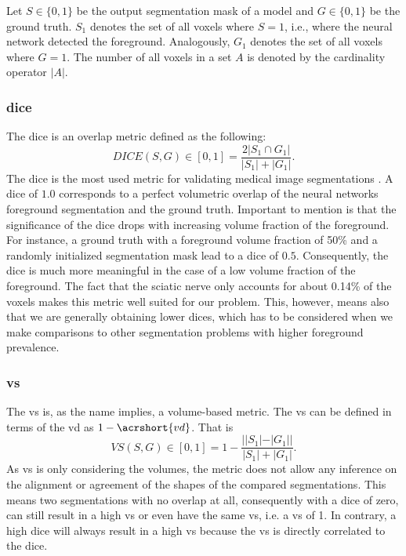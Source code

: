 Let $S \in \{0, 1\}$ be the output segmentation mask of a model and $G \in \{0, 1\}$ be the ground truth.
$S_{1}$ denotes the set of all voxels where $S = 1$, i.e., where the neural network detected the foreground. Analogously, $G_{1}$ denotes the set of all voxels where $G = 1$. The number of all voxels in a set $A$ is denoted by the cardinality operator $|A|$.

\subsubsection{\glsdesc{dice}}
The \gls{dice} \cite{Dice1945MeasuresTh} is an overlap metric defined as the following:
\begin{equation}
   DICE(S, G) \in [0, 1] = \frac{2|S_{1} \cap G_{1}|}{|S_{1}| + |G_{1}|}.
   \label{eq:dice}
\end{equation}
The \acrlong{dice} is the most used metric for validating medical image segmentations \cite{Taha2015MetricsTool}. A \acrlong{dice} of $1.0$ corresponds to a perfect volumetric overlap of the neural networks foreground segmentation and the ground truth. Important to mention is that the significance of the \acrlong{dice} drops with increasing volume fraction of the foreground. For instance, a ground truth with a foreground volume fraction of 50\% and a randomly initialized segmentation mask lead to a \acrlong{dice} of $0.5$. Consequently, the \acrlong{dice} is much more meaningful in the case of a low volume fraction of the foreground. The fact that the sciatic nerve only accounts for about 0.14\% of the voxels makes this metric well suited for our problem. This, however, means also that we are generally obtaining lower \acrlong{dice}s, which has to be considered when we make comparisons to other segmentation problems with higher foreground prevalence.

\subsubsection{\glsdesc{vs}}
The \gls{vs} \cite{Taha2015MetricsTool} is, as the name implies, a volume-based metric. The \acrlong{vs} can be defined in terms of the \gls{vd} as $1 - \acrshort{vd}$. That is
\begin{equation}
   VS(S, G) \in [0, 1] = 1 - \frac{||S_{1}| - |G_{1}||}{|S_{1}| + |G_{1}|}.
   \label{eq:vs}
\end{equation}
As \acrlong{vs} is only considering the volumes, the metric does not allow any inference on the alignment or agreement of the shapes of the compared segmentations. This means two segmentations with no overlap at all, consequently with a \acrlong{dice} of zero, can still result in a high \acrlong{vs} or even have the same \acrlong{vs}, i.e. a \acrlong{vs} of 1. In contrary, a high \acrlong{dice} will always result in a high \acrlong{vs} because the \acrlong{vs} is directly correlated to the \acrlong{dice}.

